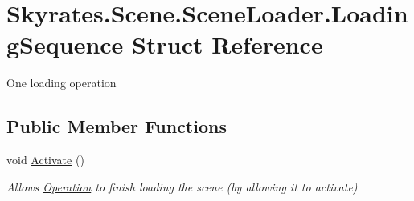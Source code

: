 \hypertarget{struct_skyrates_1_1_scene_1_1_scene_loader_1_1_loading_sequence}{\section{Skyrates.\-Scene.\-Scene\-Loader.\-Loading\-Sequence Struct Reference}
\label{struct_skyrates_1_1_scene_1_1_scene_loader_1_1_loading_sequence}
}


One loading operation  


\subsection*{Public Member Functions}
\begin{DoxyCompactItemize}
\item 
void \hyperlink{struct_skyrates_1_1_scene_1_1_scene_loader_1_1_loading_sequence_aff5005c326bbd855ad5875785fa540fc}{Activate} ()
\begin{DoxyCompactList}\small\item\em Allows \hyperlink{struct_skyrates_1_1_scene_1_1_scene_loader_1_1_loading_sequence_a1b6c883f0abf5657766a31dd020faa1a}{Operation} to finish loading the scene (by allowing it to activate) \end{DoxyCompactList}\end{DoxyCompactItemize}

